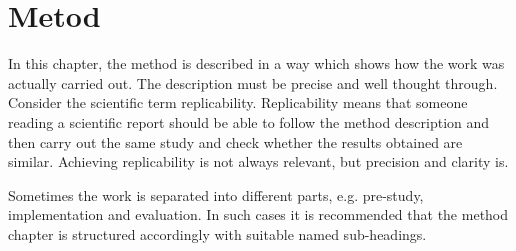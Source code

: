 \section{Metod}
\label{sec:joel_o-method}

In this chapter, the method is described in a way which shows how the
work was actually carried out. The description must be precise and
well thought through. Consider the scientific term
replicability. Replicability means that someone reading a scientific
report should be able to follow the method description and then carry
out the same study and check whether the results obtained are
similar. Achieving replicability is not always relevant, but precision
and clarity is.

Sometimes the work is separated into different parts, e.g.  pre-study,
implementation and evaluation. In such cases it is recommended that
the method chapter is structured accordingly with suitable named
sub-headings.

